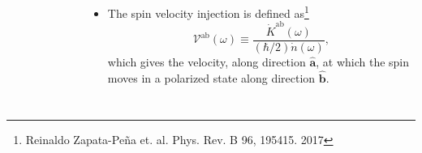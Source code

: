 \documentclass{beamer}
\begin{document}
\begin{frame}
\begin{columns}
\begin{figure}[h!]
\begin{tikzpicture}
\end{tikzpicture}
\end{figure}


\begin{itemize}
\item 
The spin velocity injection is defined as\footnote[frame]
{\tiny Reinaldo Zapata-Pe\~na et. al. Phys. Rev. B 96, 195415. 2017}
\begin{equation}\label{eq:vab-w}
\mathcal{V}^{\mathrm{ab}}(\omega) \equiv
\frac{\dot{K}^{\mathrm{ab}}(\omega)}{(\hbar/2) \dot{n}(\omega)},
\end{equation}
which gives the velocity, along direction $\hat{\mathbf{a}}$, at which the spin
moves in a polarized state along direction $\hat{\mathbf{b}}$.
\end{itemize}

\end{columns}


\end{frame}

\end{document}

